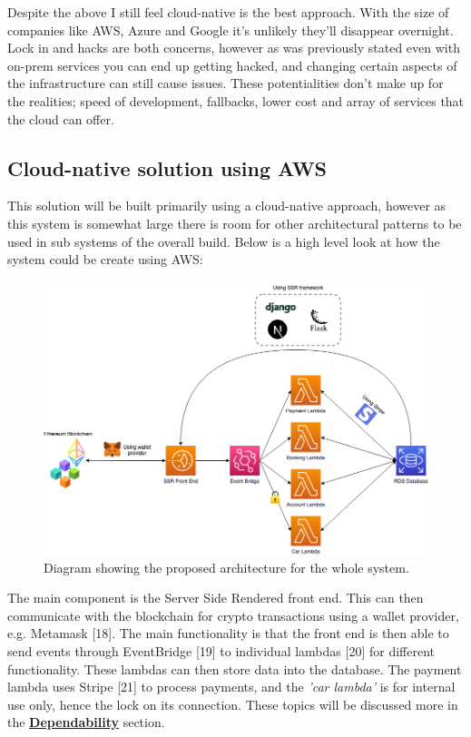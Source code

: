  Despite the above I still feel cloud-native is the best approach. With the size of companies like AWS, Azure and Google it's unlikely they'll disappear
  overnight. Lock in and hacks are both concerns, however as was previously stated even with on-prem services you can end up getting hacked, and changing
  certain aspects of the infrastructure can still cause issues. These potentialities don't make up for the realities; speed of development, fallbacks, 
  lower cost and array of services that the cloud can offer. 

  \subsection{Cloud-native solution using AWS}
  This solution will be built primarily using a cloud-native approach, however as this system is somewhat large there is room for other 
  architectural patterns to be used in sub systems of the overall build. Below is a high level look at how the system could be create using AWS:

  \begin{figure}[H]
    \centering
    \includegraphics[width=12cm]{assets/architectureEvents.drawio.png}
    \caption{Diagram showing the proposed architecture for the whole system.}
    \label{fig:architecture}
  \end{figure}

  The main component is the Server Side Rendered front end. This can then communicate with the blockchain for crypto transactions using a wallet provider,
  e.g. Metamask [18]. The main functionality is that the front end is then able to send events through EventBridge [19] to individual lambdas [20] for different 
  functionality. These lambdas can then store data into the database. The payment lambda uses Stripe [21] to process payments, and the \textit{'car lambda'} is
  for internal use only, hence the lock on its connection. These topics will be discussed more in the 
  \hyperref[sec:Dependability]{\textbf{Dependability}} section.

